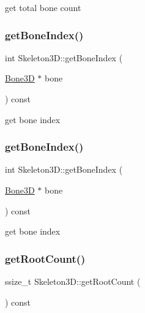 get total bone count \mbox{\label{classSkeleton3D_a0496264966b5aa0b32bb769f3d2db8e9}} 
\subsubsection{\texorpdfstring{get\+Bone\+Index()}{getBoneIndex()}\hspace{0.1cm}{\footnotesize\ttfamily [1/2]}}
{\footnotesize\ttfamily int Skeleton3\+D\+::get\+Bone\+Index (\begin{DoxyParamCaption}\item[{\hyperlink{classBone3D}{Bone3D} $\ast$}]{bone }\end{DoxyParamCaption}) const}

get bone index \mbox{\label{classSkeleton3D_a0496264966b5aa0b32bb769f3d2db8e9}} 
\subsubsection{\texorpdfstring{get\+Bone\+Index()}{getBoneIndex()}\hspace{0.1cm}{\footnotesize\ttfamily [2/2]}}
{\footnotesize\ttfamily int Skeleton3\+D\+::get\+Bone\+Index (\begin{DoxyParamCaption}\item[{\hyperlink{classBone3D}{Bone3D} $\ast$}]{bone }\end{DoxyParamCaption}) const}

get bone index \mbox{\label{classSkeleton3D_affbb06a719abb420aa4ca170a153d3ab}} 
\subsubsection{\texorpdfstring{get\+Root\+Count()}{getRootCount()}\hspace{0.1cm}{\footnotesize\ttfamily [1/2]}}
{\footnotesize\ttfamily ssize\+\_\+t Skeleton3\+D\+::get\+Root\+Count (\begin{DoxyParamCaption}{ }\end{DoxyParamCaption}) const}

